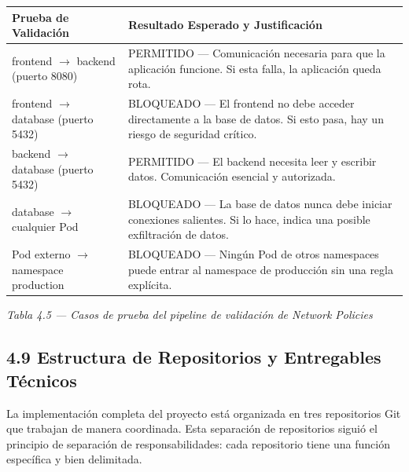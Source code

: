 \documentclass[journal]{IEEEtran}
\begin{document}
\begin{table}[htbp]
\centering
\scriptsize
\begin{tabularx}{\textwidth}{|Y|Y|}
\hline
\textbf{Prueba de Validación} & \textbf{Resultado Esperado y Justificación} \\
\hline
frontend $\rightarrow$ backend (puerto 8080) & PERMITIDO --- Comunicación necesaria para que la aplicación funcione. Si esta falla, la aplicación queda rota. \\
frontend $\rightarrow$ database (puerto 5432) & BLOQUEADO --- El frontend no debe acceder directamente a la base de datos. Si esto pasa, hay un riesgo de seguridad crítico. \\
backend $\rightarrow$ database (puerto 5432) & PERMITIDO --- El backend necesita leer y escribir datos. Comunicación esencial y autorizada. \\
database $\rightarrow$ cualquier Pod & BLOQUEADO --- La base de datos nunca debe iniciar conexiones salientes. Si lo hace, indica una posible exfiltración de datos. \\
Pod externo $\rightarrow$ namespace production & BLOQUEADO --- Ningún Pod de otros namespaces puede entrar al namespace de producción sin una regla explícita. \\
\hline
\end{tabularx}
\end{table}

\begin{center}\emph{\emph{Tabla 4.5 --- Casos de prueba del pipeline de validación de Network Policies}}\end{center}

\subsection{4.9 Estructura de Repositorios y Entregables Técnicos}

La implementación completa del proyecto está organizada en tres repositorios Git que trabajan de manera coordinada. Esta separación de repositorios siguió el principio de separación de responsabilidades: cada repositorio tiene una función específica y bien delimitada.
\end{document}

